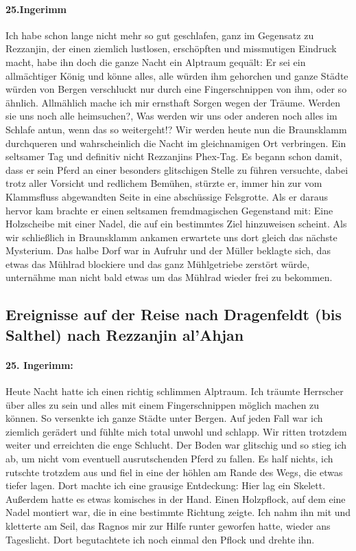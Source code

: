 \paragraph{25.Ingerimm}

Ich habe schon lange nicht mehr so gut geschlafen, ganz im Gegensatz zu Rezzanjin, der einen ziemlich lustlosen, erschöpften und missmutigen Eindruck macht, habe ihn doch die ganze Nacht ein Alptraum gequält: Er sei ein allmächtiger König und könne alles, alle würden ihm gehorchen und ganze Städte würden von Bergen verschluckt nur durch eine Fingerschnippen von ihm, oder so ähnlich. Allmählich mache ich mir ernsthaft Sorgen wegen der Träume. Werden sie uns noch alle heimsuchen?, Was werden wir uns oder anderen noch alles im Schlafe antun, wenn das so weitergeht!? Wir werden heute nun die Braunsklamm durchqueren und wahrscheinlich die Nacht im gleichnamigen Ort verbringen.
Ein seltsamer Tag und definitiv nicht Rezzanjins Phex-Tag. Es begann schon damit, dass er sein Pferd an einer besonders glitschigen Stelle zu führen versuchte, dabei trotz aller Vorsicht und redlichem Bemühen, stürzte er, immer hin zur vom Klammsfluss abgewandten Seite in eine abschüssige Felsgrotte. Als er daraus hervor kam brachte er einen seltsamen fremdmagischen Gegenstand mit: Eine Holzscheibe mit einer Nadel, die auf ein bestimmtes Ziel hinzuweisen scheint. Als wir schließlich in Braunsklamm ankamen erwartete uns dort gleich das nächste Mysterium. Das halbe Dorf war in Aufruhr und der Müller beklagte sich, das etwas das Mühlrad blockiere und das ganz Mühlgetriebe zerstört würde, unternähme man nicht bald etwas um das Mühlrad wieder frei zu bekommen.

\subsection{Ereignisse auf der Reise nach Dragenfeldt (bis Salthel) nach Rezzanjin al'Ahjan}

\paragraph{25. Ingerimm:}
Heute Nacht hatte ich einen richtig schlimmen Alptraum. Ich träumte Herrscher über alles zu sein und alles mit einem Fingerschnippen möglich machen zu können. So versenkte ich ganze Städte unter Bergen. Auf jeden Fall war ich ziemlich gerädert und fühlte mich total unwohl und schlapp. Wir ritten trotzdem weiter und erreichten die enge Schlucht. Der Boden war glitschig und so stieg ich ab, um nicht vom eventuell ausrutschenden Pferd zu fallen. Es half nichts, ich rutschte trotzdem aus und fiel in eine der höhlen am Rande des Wegs, die etwas tiefer lagen. Dort machte ich eine grausige Entdeckung: Hier lag ein Skelett. Außerdem hatte es etwas komisches in der Hand. Einen Holzpflock, auf dem eine Nadel montiert war, die in eine bestimmte Richtung zeigte. Ich nahm ihn mit und kletterte am Seil, das Ragnos mir zur Hilfe runter geworfen hatte, wieder ans Tageslicht. Dort begutachtete ich noch einmal den Pflock und drehte ihn.


